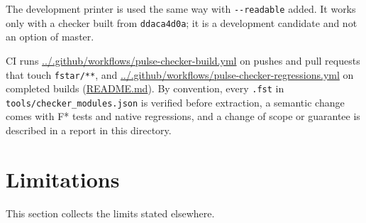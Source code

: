 \documentclass[10pt,a4paper]{article}
\begin{document}
The development printer is used the same way with \texttt{-{}\allowbreak{}-{}\allowbreak{}readable} added. It works only with a checker built from \texttt{ddaca4d0a}; it is a development candidate and not an option of master.

CI runs \href{https://github.com/Z3Prover/z3/blob/8fbb275aba0472e862e289c7af1331b3bd5d512c/.github/workflows/pulse-checker-build.yml}{.\allowbreak{}.\allowbreak{}/\allowbreak{}.\allowbreak{}github/\allowbreak{}workflows/\allowbreak{}pulse-checker-build.\allowbreak{}yml} on pushes and pull requests that touch \texttt{fstar/\allowbreak{}**}, and \href{https://github.com/Z3Prover/z3/blob/8fbb275aba0472e862e289c7af1331b3bd5d512c/.github/workflows/pulse-checker-regressions.yml}{.\allowbreak{}.\allowbreak{}/\allowbreak{}.\allowbreak{}github/\allowbreak{}workflows/\allowbreak{}pulse-checker-regressions.\allowbreak{}yml} on completed builds (\href{https://github.com/Z3Prover/z3/blob/8fbb275aba0472e862e289c7af1331b3bd5d512c/fstar/README.md\#L108-L139}{README.\allowbreak{}md}). By convention, every \texttt{.\allowbreak{}fst} in \texttt{tools/\allowbreak{}checker\_\allowbreak{}modules.\allowbreak{}json} is verified before extraction, a semantic change comes with F* tests and native regressions, and a change of scope or guarantee is described in a report in this directory.

\section{Limitations}\label{sec:9-limitations}

This section collects the limits stated elsewhere.
\end{document}
